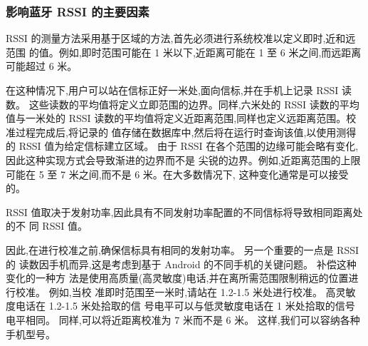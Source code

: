 \documentclass[UTF8]{ctexart}
\begin{document}
\subsubsection{影响蓝牙 RSSI 的主要因素}
RSSI 的测量方法采用基于区域的方法,首先必须进行系统校准以定义即时,近和远范围
的值。例如,即时范围可能在 1 米以下,近距离可能在 1 至 6 米之间,而远距离可能超过 6
米。
\par
在这种情况下,用户可以站在信标正好一米处,面向信标,并在手机上记录 RSSI 读数。
这些读数的平均值将定义立即范围的边界。同样,六米处的 RSSI 读数的平均值与一米处的
RSSI 读数的平均值将定义近距离范围,同样也定义远距离范围。校准过程完成后,将记录的
值存储在数据库中,然后将在运行时查询该值,以使用测得的 RSSI 值为给定信标建立区域。
由于 RSSI 在各个范围的边缘可能会略有变化,因此这种实现方式会导致渐进的边界而不是
尖锐的边界。例如,近距离范围的上限可能在 5 至 7 米之间,而不是 6 米。在大多数情况下,
这种变化通常是可以接受的。
\par
RSSI 值取决于发射功率,因此具有不同发射功率配置的不同信标将导致相同距离处的不
同 RSSI 值。
\par
因此,在进行校准之前,确保信标具有相同的发射功率。 另一个重要的一点是 RSSI 的
读数因手机而异,这是考虑到基于 Android 的不同手机的关键问题。 补偿这种变化的一种方
法是使用高质量(高灵敏度)电话,并在离所需范围限制稍远的位置进行校准。 例如,当校
准即时范围至一米时,请站在 1.2-1.5 米处进行校准。 高灵敏度电话在 1.2-1.5 米处拾取的信
号电平可以与低灵敏度电话在 1 米处拾取的信号电平相同。 同样,可以将近距离校准为 7
米而不是 6 米。 这样,我们可以容纳各种手机型号。
\end{document}
